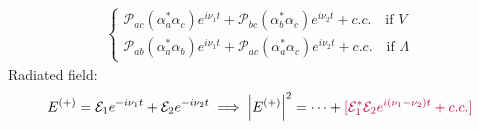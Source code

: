 \documentclass{beamer}
\theoremstyle{definition}
\newcommand{\al}{\alpha}
\begin{document}
\begin{frame}
\begin{align*}
\begin{cases*}
\mathcal{P}_{ac} (\al_a^*\al_c) e^{i\nu_1 t} + \mathcal{P}_{bc}(\al_b^* \al_c) e^{i\nu_2 t} + c.c. \quad \text{if } V\\
\mathcal{P}_{ab} (\al_a^*\al_b) e^{i\nu_1 t} + \mathcal{P}_{ac}(\al_a^* \al_c) e^{i\nu_2 t} + c.c. \quad \text{if } \Lambda
\end{cases*}
\end{align*}
Radiated field:
\begin{align*}
E^{(+)} = \mathcal{E}_1 e^{-i\nu_1 t} + \mathcal{E}_2 e^{-i \nu_2 t} 
\implies \abs{E^{(+)}}^2 = \dots + \textcolor{purple}{[\mathcal{E}_1^*\mathcal{E}_2 e^{i(\nu_1 - \nu_2) t} + c.c.]}
\end{align*}
	
	
\end{frame}
\end{document}
